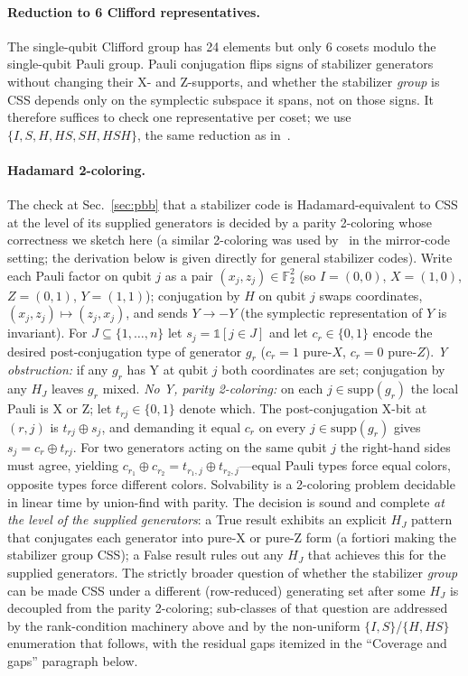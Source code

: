 \documentclass[aps,prxquantum,twocolumn,superscriptaddress,nofootinbib]{revtex4-2}
\newcommand{\FF}{\ensuremath{\mathbb{F}}}
\begin{document}
\paragraph{Reduction to 6 Clifford representatives.}
The single-qubit Clifford group has 24 elements but only 6 cosets modulo the single-qubit Pauli group. Pauli conjugation flips signs of stabilizer generators without changing their X- and Z-supports, and whether the stabilizer \emph{group} is CSS depends only on the symplectic subspace it spans, not on those signs. It therefore suffices to check one representative per coset; we use $\{I, S, H, HS, SH, HSH\}$, the same reduction as in~\cite[\S7.2]{cross2025small}.

\paragraph{Hadamard 2-coloring.}
The check at Sec.~\ref{sec:pbb} that a stabilizer code is Hadamard-equivalent to CSS at the level of its supplied generators is decided by a parity 2-coloring whose correctness we sketch here (a similar 2-coloring was used by~\cite{khesin2026mirror} in the mirror-code setting; the derivation below is given directly for general stabilizer codes).
Write each Pauli factor on qubit $j$ as a pair $(x_j, z_j) \in \FF_2^2$ (so $I = (0,0)$, $X = (1,0)$, $Z = (0,1)$, $Y = (1,1)$); conjugation by $H$ on qubit $j$ swaps coordinates, $(x_j, z_j) \mapsto (z_j, x_j)$, and sends $Y \to -Y$ (the symplectic representation of $Y$ is invariant).
For $J \subseteq \{1,\dots,n\}$ let $s_j = \mathbb{1}[j \in J]$ and let $c_r \in \{0,1\}$ encode the desired post-conjugation type of generator $g_r$ ($c_r = 1$ pure-$X$, $c_r = 0$ pure-$Z$).
\emph{Y obstruction:} if any $g_r$ has Y at qubit $j$ both coordinates are set; conjugation by any $H_J$ leaves $g_r$ mixed.
\emph{No Y, parity 2-coloring:} on each $j \in \mathrm{supp}(g_r)$ the local Pauli is X or Z; let $t_{rj} \in \{0,1\}$ denote which.
The post-conjugation X-bit at $(r,j)$ is $t_{rj} \oplus s_j$, and demanding it equal $c_r$ on every $j \in \mathrm{supp}(g_r)$ gives $s_j = c_r \oplus t_{rj}$.
For two generators acting on the same qubit $j$ the right-hand sides must agree, yielding $c_{r_1} \oplus c_{r_2} = t_{r_1, j} \oplus t_{r_2, j}$---equal Pauli types force equal colors, opposite types force different colors.
Solvability is a 2-coloring problem decidable in linear time by union-find with parity.
The decision is sound and complete \emph{at the level of the supplied generators}: a True result exhibits an explicit $H_J$ pattern that conjugates each generator into pure-X or pure-Z form (a fortiori making the stabilizer group CSS); a False result rules out any $H_J$ that achieves this for the supplied generators.
The strictly broader question of whether the stabilizer \emph{group} can be made CSS under a different (row-reduced) generating set after some $H_J$ is decoupled from the parity 2-coloring; sub-classes of that question are addressed by the rank-condition machinery above and by the non-uniform $\{I,S\}$/$\{H,HS\}$ enumeration that follows, with the residual gaps itemized in the ``Coverage and gaps'' paragraph below.
\end{document}
